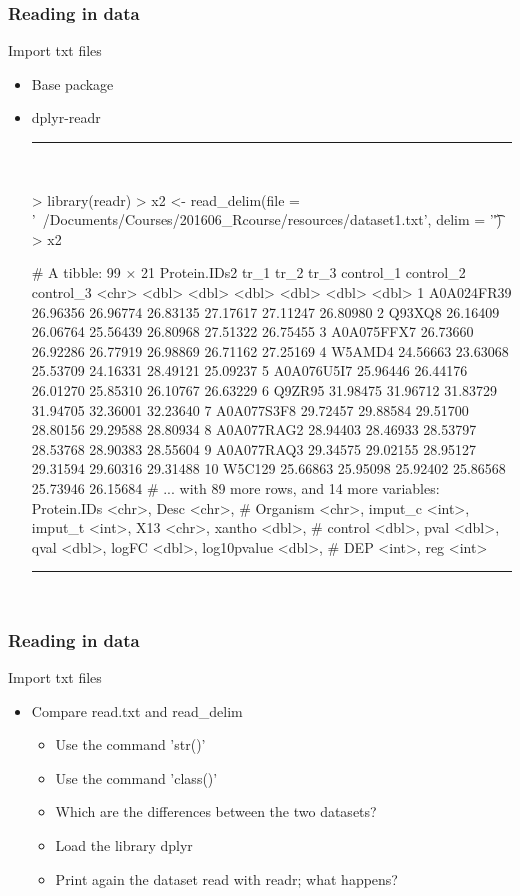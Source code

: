 \documentclass{beamer}
\begin{document}
\begin{frame}[fragile]
	\frametitle{Reading in data}
	\centering \Large Import txt files
	\begin{itemize}
		\small
		\item Base package
		\item dplyr-readr
\rule{\textwidth}{0.4pt}\\
\tiny
\setlength{\fancyvrbtopsep}{-1pt}
\setlength{\fancyvrbpartopsep}{-1pt}
\begin{Schunk}
\begin{Sinput}
> library(readr)
> x2 <- read_delim(file = '~/Documents/Courses/201606_Rcourse/resources/dataset1.txt', delim = '\t')
> x2
\end{Sinput}
\begin{Soutput}
# A tibble: 99 × 21
   Protein.IDs2     tr_1     tr_2     tr_3 control_1 control_2 control_3
          <chr>    <dbl>    <dbl>    <dbl>     <dbl>     <dbl>     <dbl>
1    A0A024FR39 26.96356 26.96774 26.83135  27.17617  27.11247  26.80980
2        Q93XQ8 26.16409 26.06764 25.56439  26.80968  27.51322  26.75455
3    A0A075FFX7 26.73660 26.92286 26.77919  26.98869  26.71162  27.25169
4        W5AMD4 24.56663 23.63068 25.53709  24.16331  28.49121  25.09237
5    A0A076U5I7 25.96446 26.44176 26.01270  25.85310  26.10767  26.63229
6        Q9ZR95 31.98475 31.96712 31.83729  31.94705  32.36001  32.23640
7    A0A077S3F8 29.72457 29.88584 29.51700  28.80156  29.29588  28.80934
8    A0A077RAG2 28.94403 28.46933 28.53797  28.53768  28.90383  28.55604
9    A0A077RAQ3 29.34575 29.02155 28.95127  29.31594  29.60316  29.31488
10       W5C129 25.66863 25.95098 25.92402  25.86568  25.73946  26.15684
# ... with 89 more rows, and 14 more variables: Protein.IDs <chr>, Desc <chr>,
#   Organism <chr>, imput_c <int>, imput_t <int>, X13 <chr>, xantho <dbl>,
#   control <dbl>, pval <dbl>, qval <dbl>, logFC <dbl>, log10pvalue <dbl>,
#   DEP <int>, reg <int>
\end{Soutput}
\end{Schunk}
\rule{\textwidth}{0.4pt}\\
\small
	
	\end{itemize}
\end{frame}


\begin{frame}[fragile]
	\frametitle{Reading in data}
	\centering \Large Import txt files
	\begin{itemize}
		\small
		\item Compare read.txt and read\_delim
			\begin{itemize}
				\item Use the command 'str()'
				\item Use the command 'class()'
				\item Which are the differences between the two datasets?
			\pause
				\item Load the library dplyr
				\item Print again the dataset read with readr; what happens?
			\end{itemize}
\small
	
	\end{itemize}
\end{frame}
\end{document}
